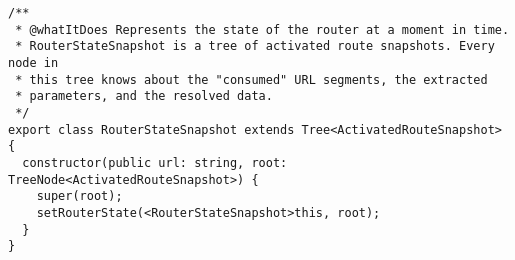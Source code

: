 \begin{verbatim}
/**
 * @whatItDoes Represents the state of the router at a moment in time.
 * RouterStateSnapshot is a tree of activated route snapshots. Every node in
 * this tree knows about the "consumed" URL segments, the extracted
 * parameters, and the resolved data.
 */
export class RouterStateSnapshot extends Tree<ActivatedRouteSnapshot> {
  constructor(public url: string, root: TreeNode<ActivatedRouteSnapshot>) {
    super(root);
    setRouterState(<RouterStateSnapshot>this, root);
  }
}
\end{verbatim}
